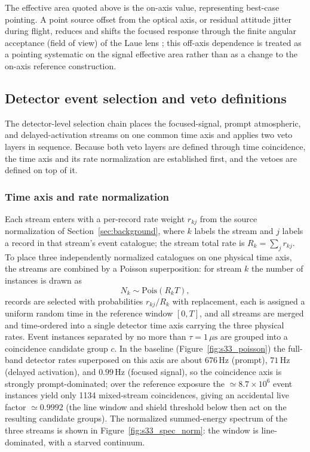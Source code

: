 \documentclass[11pt]{article}
\begin{document}
The effective area quoted above is the on-axis value, representing best-case
pointing. A point source offset from the optical axis, or residual attitude
jitter during flight, reduces and shifts the focused response through the finite
angular acceptance (field of view) of the Laue lens
\cite{Barriere2009Laue,Weidenspointner2006MAX}; this off-axis dependence is
treated as a pointing systematic on the signal effective area rather than as a
change to the on-axis reference construction.

\subsection{Detector event selection and veto definitions}
\label{sec:selection}

The detector-level selection chain places the focused-signal, prompt
atmospheric, and delayed-activation streams on one common time axis and applies
two veto layers in sequence. Because both veto layers are defined through time
coincidence, the time axis and its rate normalization are established first, and
the vetoes are defined on top of it.

\subsubsection{Time axis and rate normalization}

Each stream enters with a per-record rate weight $r_{kj}$ from the source
normalization of Section~\ref{sec:background}, where $k$ labels the stream and
$j$ labels a record in that stream's event catalogue; the stream total rate is
$R_k=\sum_j r_{kj}$. To place three independently normalized catalogues on one
physical time axis, the streams are combined by a Poisson superposition: for
stream $k$ the number of instances is drawn as
\begin{equation}
  N_k\sim \mathrm{Pois}(R_k T),
\end{equation}
records are selected with probabilities $r_{kj}/R_k$ with replacement, each is
assigned a uniform random time in the reference window $[0,T]$, and all streams
are merged and time-ordered into a single detector time axis carrying the three
physical rates. Event instances separated by no more than $\tau=1\,\mu\mathrm{s}$
are grouped into a coincidence candidate group $c$. In the baseline (Figure~\ref{fig:s33_poisson}) the full-band detector rates superposed on this axis are about $676\,\mathrm{Hz}$ (prompt), $71\,\mathrm{Hz}$ (delayed activation), and $0.99\,\mathrm{Hz}$ (focused signal), so the coincidence axis is strongly prompt-dominated; over the reference exposure the $\simeq8.7\times10^{6}$ event instances yield only 1134 mixed-stream coincidences, giving an accidental live factor $\simeq0.9992$ (the line window and shield threshold below then act on the resulting candidate groups). The normalized summed-energy spectrum of the three streams is shown in Figure~\ref{fig:s33_spec_norm}: the window is line-dominated, with a starved continuum.
\end{document}
